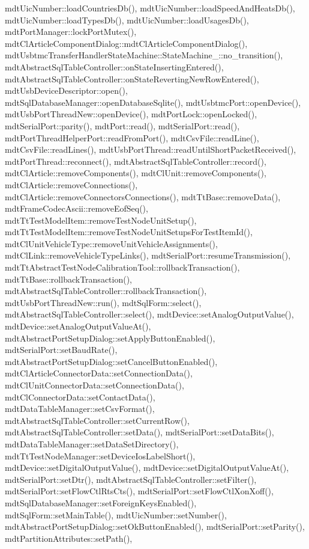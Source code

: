 mdt\-Uic\-Number\-::load\-Countries\-Db(), mdt\-Uic\-Number\-::load\-Speed\-And\-Heats\-Db(), mdt\-Uic\-Number\-::load\-Types\-Db(), mdt\-Uic\-Number\-::load\-Usages\-Db(), mdt\-Port\-Manager\-::lock\-Port\-Mutex(), mdt\-Cl\-Article\-Component\-Dialog\-::mdt\-Cl\-Article\-Component\-Dialog(), mdt\-Usbtmc\-Transfer\-Handler\-State\-Machine\-::\-State\-Machine\-\_\-\-::no\-\_\-transition(), mdt\-Abstract\-Sql\-Table\-Controller\-::on\-State\-Inserting\-Entered(), mdt\-Abstract\-Sql\-Table\-Controller\-::on\-State\-Reverting\-New\-Row\-Entered(), mdt\-Usb\-Device\-Descriptor\-::open(), mdt\-Sql\-Database\-Manager\-::open\-Database\-Sqlite(), mdt\-Usbtmc\-Port\-::open\-Device(), mdt\-Usb\-Port\-Thread\-New\-::open\-Device(), mdt\-Port\-Lock\-::open\-Locked(), mdt\-Serial\-Port\-::parity(), mdt\-Port\-::read(), mdt\-Serial\-Port\-::read(), mdt\-Port\-Thread\-Helper\-Port\-::read\-From\-Port(), mdt\-Csv\-File\-::read\-Line(), mdt\-Csv\-File\-::read\-Lines(), mdt\-Usb\-Port\-Thread\-::read\-Until\-Short\-Packet\-Received(), mdt\-Port\-Thread\-::reconnect(), mdt\-Abstract\-Sql\-Table\-Controller\-::record(), mdt\-Cl\-Article\-::remove\-Components(), mdt\-Cl\-Unit\-::remove\-Components(), mdt\-Cl\-Article\-::remove\-Connections(), mdt\-Cl\-Article\-::remove\-Connectors\-Connections(), mdt\-Tt\-Base\-::remove\-Data(), mdt\-Frame\-Codec\-Ascii\-::remove\-Eof\-Seq(), mdt\-Tt\-Test\-Model\-Item\-::remove\-Test\-Node\-Unit\-Setup(), mdt\-Tt\-Test\-Model\-Item\-::remove\-Test\-Node\-Unit\-Setups\-For\-Test\-Item\-Id(), mdt\-Cl\-Unit\-Vehicle\-Type\-::remove\-Unit\-Vehicle\-Assignments(), mdt\-Cl\-Link\-::remove\-Vehicle\-Type\-Links(), mdt\-Serial\-Port\-::resume\-Transmission(), mdt\-Tt\-Abstract\-Test\-Node\-Calibration\-Tool\-::rollback\-Transaction(), mdt\-Tt\-Base\-::rollback\-Transaction(), mdt\-Abstract\-Sql\-Table\-Controller\-::rollback\-Transaction(), mdt\-Usb\-Port\-Thread\-New\-::run(), mdt\-Sql\-Form\-::select(), mdt\-Abstract\-Sql\-Table\-Controller\-::select(), mdt\-Device\-::set\-Analog\-Output\-Value(), mdt\-Device\-::set\-Analog\-Output\-Value\-At(), mdt\-Abstract\-Port\-Setup\-Dialog\-::set\-Apply\-Button\-Enabled(), mdt\-Serial\-Port\-::set\-Baud\-Rate(), mdt\-Abstract\-Port\-Setup\-Dialog\-::set\-Cancel\-Button\-Enabled(), mdt\-Cl\-Article\-Connector\-Data\-::set\-Connection\-Data(), mdt\-Cl\-Unit\-Connector\-Data\-::set\-Connection\-Data(), mdt\-Cl\-Connector\-Data\-::set\-Contact\-Data(), mdt\-Data\-Table\-Manager\-::set\-Csv\-Format(), mdt\-Abstract\-Sql\-Table\-Controller\-::set\-Current\-Row(), mdt\-Abstract\-Sql\-Table\-Controller\-::set\-Data(), mdt\-Serial\-Port\-::set\-Data\-Bits(), mdt\-Data\-Table\-Manager\-::set\-Data\-Set\-Directory(), mdt\-Tt\-Test\-Node\-Manager\-::set\-Device\-Ios\-Label\-Short(), mdt\-Device\-::set\-Digital\-Output\-Value(), mdt\-Device\-::set\-Digital\-Output\-Value\-At(), mdt\-Serial\-Port\-::set\-Dtr(), mdt\-Abstract\-Sql\-Table\-Controller\-::set\-Filter(), mdt\-Serial\-Port\-::set\-Flow\-Ctl\-Rts\-Cts(), mdt\-Serial\-Port\-::set\-Flow\-Ctl\-Xon\-Xoff(), mdt\-Sql\-Database\-Manager\-::set\-Foreign\-Keys\-Enabled(), mdt\-Sql\-Form\-::set\-Main\-Table(), mdt\-Uic\-Number\-::set\-Number(), mdt\-Abstract\-Port\-Setup\-Dialog\-::set\-Ok\-Button\-Enabled(), mdt\-Serial\-Port\-::set\-Parity(), mdt\-Partition\-Attributes\-::set\-Path(), 